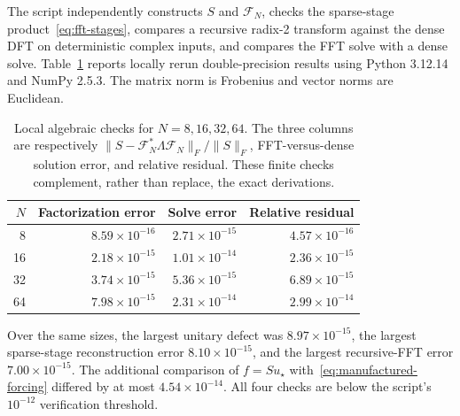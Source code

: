 \documentclass[11pt,a4paper]{article}
\begin{document}
The script  independently constructs $S$ and $\mathcal F_N$, checks the sparse-stage product~\eqref{eq:fft-stages}, compares a recursive radix-2 transform against the dense DFT on deterministic complex inputs, and compares the FFT solve with a dense solve. Table~\ref{tab:fft-algebra} reports locally rerun double-precision results using Python 3.12.14 and NumPy 2.5.3. The matrix norm is Frobenius and vector norms are Euclidean.
\begin{table}[htbp]
\centering\small
\caption{Local algebraic checks for $N=8,16,32,64$. The three columns are respectively $\|S-\mathcal F_N^*\Lambda\mathcal F_N\|_F/\|S\|_F$, FFT-versus-dense solution error, and relative residual. These finite checks complement, rather than replace, the exact derivations.}
\label{tab:fft-algebra}
\begin{tabular}{@{}rrrr@{}}
\toprule
$N$ & Factorization error & Solve error & Relative residual \\
\midrule
8  & $8.59\times10^{-16}$ & $2.71\times10^{-15}$ & $4.57\times10^{-16}$\\
16 & $2.18\times10^{-15}$ & $1.01\times10^{-14}$ & $2.36\times10^{-15}$\\
32 & $3.74\times10^{-15}$ & $5.36\times10^{-15}$ & $6.89\times10^{-15}$\\
64 & $7.98\times10^{-15}$ & $2.31\times10^{-14}$ & $2.99\times10^{-14}$\\
\bottomrule
\end{tabular}
\end{table}

Over the same sizes, the largest unitary defect was $8.97\times10^{-15}$, the largest sparse-stage reconstruction error $8.10\times10^{-15}$, and the largest recursive-FFT error $7.00\times10^{-15}$. The additional comparison of $f=Su_\star$ with~\eqref{eq:manufactured-forcing} differed by at most $4.54\times10^{-14}$. All four checks are below the script's $10^{-12}$ verification threshold.
\end{document}
